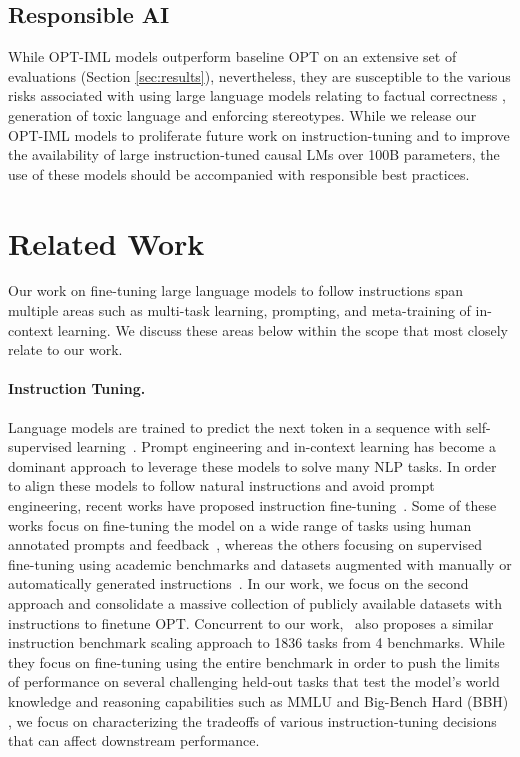  \subsection{Responsible AI} While OPT-IML models outperform baseline OPT on an extensive set of evaluations (Section \ref{sec:results}), nevertheless, they are susceptible to the various risks associated with using large language models relating to factual correctness \citep{thoppilan2022lamda,brown2020gpt,chowdhery2022palm}, generation of toxic language \citep{gehman2020realtoxicityprompts} and enforcing stereotypes. While we release our OPT-IML models to proliferate future work on instruction-tuning and to improve the availability of large instruction-tuned causal LMs over 100B parameters, the use of these models should be accompanied with responsible best practices. 

\section{Related Work} Our work on fine-tuning large language models to follow instructions span multiple areas such as multi-task learning, prompting, and meta-training of in-context learning. We discuss these areas below within the scope that most closely relate to our work.

\paragraph{Instruction Tuning.} Language models are trained to predict the next token in a sequence with self-supervised learning~\citep{brown2020gpt,zhang2022opt,chowdhery2022palm}. Prompt engineering and in-context learning has become a dominant approach to leverage these models to solve many NLP tasks. In order to align these models to follow natural instructions and avoid prompt engineering, recent works have proposed instruction fine-tuning~\citep{ouyang2022gpt3instruct,wei2021flan,chung2022flanpalm,wang2022niv2}. Some of these works focus on fine-tuning the model on a wide range of tasks using human annotated prompts and feedback~\citep{ouyang2022gpt3instruct}, whereas the others focusing on supervised fine-tuning using academic benchmarks and datasets augmented with manually or automatically generated instructions~\citep{wang2022niv2,wei2021flan,sanh2021t0,Zhong2021AdaptingLM}. In our work, we focus on the second approach and consolidate a massive collection of publicly available datasets with instructions to finetune OPT. Concurrent to our work,~\citet{chung2022scaling} also proposes a similar instruction benchmark scaling approach to 1836 tasks from 4 benchmarks. While they focus on fine-tuning using the entire benchmark in order to push the limits of performance on several challenging held-out tasks that test the model's world knowledge and reasoning capabilities such as MMLU \citep{hendrycks2020measuring} and Big-Bench Hard (BBH) \citep{suzgun2022challenging}, we focus on characterizing the tradeoffs of various instruction-tuning decisions that can affect downstream performance. 

